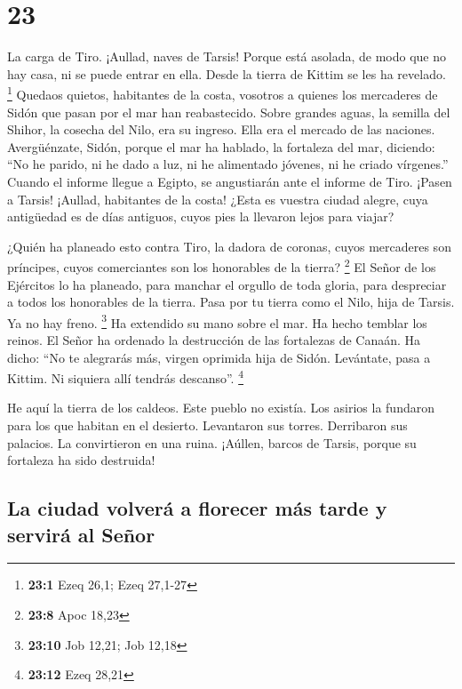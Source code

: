 \hypertarget{section-22}{%
\section{23}\label{section-22}}

 La carga de Tiro. ¡Aullad, naves de Tarsis! Porque está
asolada, de modo que no hay casa, ni se puede entrar en ella. Desde la
tierra de Kittim se les ha revelado. \footnote{\textbf{23:1} Ezeq 26,1;
  Ezeq 27,1-27}  Quedaos quietos, habitantes de la costa,
vosotros a quienes los mercaderes de Sidón que pasan por el mar han
reabastecido.  Sobre grandes aguas, la semilla del Shihor,
la cosecha del Nilo, era su ingreso. Ella era el mercado de las
naciones.  Avergüénzate, Sidón, porque el mar ha hablado,
la fortaleza del mar, diciendo: ``No he parido, ni he dado a luz, ni he
alimentado jóvenes, ni he criado vírgenes.''  Cuando el
informe llegue a Egipto, se angustiarán ante el informe de Tiro.
 ¡Pasen a Tarsis! ¡Aullad, habitantes de la costa!
 ¿Esta es vuestra ciudad alegre, cuya antigüedad es de
días antiguos, cuyos pies la llevaron lejos para viajar?

 ¿Quién ha planeado esto contra Tiro, la dadora de
coronas, cuyos mercaderes son príncipes, cuyos comerciantes son los
honorables de la tierra? \footnote{\textbf{23:8} Apoc 18,23}
 El Señor de los Ejércitos lo ha planeado, para manchar el
orgullo de toda gloria, para despreciar a todos los honorables de la
tierra.  Pasa por tu tierra como el Nilo, hija de Tarsis.
Ya no hay freno. \footnote{\textbf{23:10} Job 12,21; Job 12,18}
 Ha extendido su mano sobre el mar. Ha hecho temblar los
reinos. El Señor ha ordenado la destrucción de las fortalezas de Canaán.
 Ha dicho: ``No te alegrarás más, virgen oprimida hija de
Sidón. Levántate, pasa a Kittim. Ni siquiera allí tendrás descanso''.
\footnote{\textbf{23:12} Ezeq 28,21}

 He aquí la tierra de los caldeos. Este pueblo no
existía. Los asirios la fundaron para los que habitan en el desierto.
Levantaron sus torres. Derribaron sus palacios. La convirtieron en una
ruina.  ¡Aúllen, barcos de Tarsis, porque su fortaleza ha
sido destruida!

\hypertarget{la-ciudad-volveruxe1-a-florecer-muxe1s-tarde-y-serviruxe1-al-seuxf1or}{%
\subsection{La ciudad volverá a florecer más tarde y servirá al
Señor}\label{la-ciudad-volveruxe1-a-florecer-muxe1s-tarde-y-serviruxe1-al-seuxf1or}}

